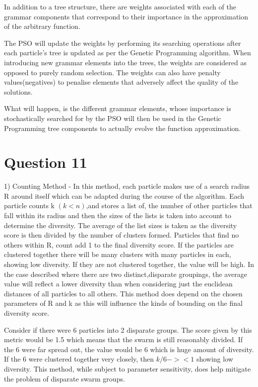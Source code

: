 \documentclass[12pt]{article}
\begin{document}
In addition to a tree structure, there are weights associated with each of the grammar components that correspond to their importance in the approximation of the arbitrary function. 

The PSO will update the weights by performing its searching operations after each particle's tree is updated as per the Genetic Programming algorithm. When introducing new grammar elements into the trees, the weights are considered as opposed to purely random selection. The weights can also have penalty values(negatives) to penalise elements that adversely affect the quality of the solutions.

What will happen, is the different grammar elements, whose importance is stochastically searched for by the PSO will then be used in the Genetic Programming tree components to actually evolve the function approximation.
\section{Question 11}
1) Counting Method - In this method, each particle makes use of a search radius R around itself which can be adapted during the course of the algorithm. Each particle counts k $(k<n)$,and stores a list of, the number of other particles that fall within its radius and then the sizes of the lists is taken into account to determine the diversity. The average of the list sizes is taken as the diversity score is then divided by the number of clusters formed. Particles that find no others within R, count add 1 to the final diversity score. If the particles are clustered together there will be many clusters with many particles in each, showing low diversity. If they are not clustered together, the value will be high. In the case described where there are two distinct,disparate groupings, the average value will reflect a lower diversity than when considering just the euclidean distances of all particles to all others. This method does depend on the chosen parameters of R and k as this will influence the kinds of bounding on the final diversity score. 

	Consider if there were 6 particles into 2 disparate groups. The score given by this metric would be 1.5 which means that the swarm is still reasonably divided. If the 6 were far spread out, the value would be 6 which is huge amount of diversity. If the 6 were clustered together very closely, then $k/6 -> <1$ showing low diversity. This method, while subject to parameter sensitivity, does help mitigate the problem of disparate swarm groups.
\end{document}
